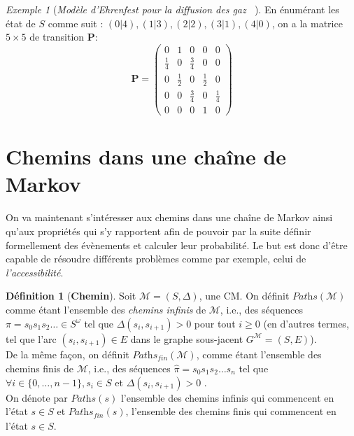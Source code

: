 \documentclass[12pt,a4paper]{report}
\theoremstyle{definition}%
\newtheorem{definition}{Définition}[chapter]
\theoremstyle{remark}
\newtheorem{example}{Exemple}[chapter]
\newcommand{\ie}{i.e., }
\begin{document}
\begin{example}[\textit{Modèle d'Ehrenfest pour la diffusion des gaz ~\cite{Course3}}]
	En énumérant les état de $S$ comme suit : $(0|4), (1|3), (2|2), (3|1), (4|0)$, on a la matrice $5\times5$ de transition $\textbf{P}$:
	\[
		\textbf{P} =
			\begin{pmatrix}
			0 & 1 & 0 & 0 & 0 \\
			\frac{1}{4} & 0 & \frac{3}{4}& 0 & 0 \\
			0 & \frac{1}{2} & 0 & \frac{1}{2} & 0 \\
			0 & 0 & \frac{3}{4} & 0 & \frac{1}{4} \\
			0 & 0 & 0 & 1 & 0
			\end{pmatrix}
	\]
\end{example}

\section{Chemins dans une chaîne de Markov}
On va maintenant s'intéresser aux chemins dans une chaîne de Markov ainsi qu'aux propriétés qui s'y rapportent afin de pouvoir par la suite définir formellement des évènements et calculer leur probabilité. Le but est donc d'être capable de résoudre différents problèmes comme par exemple, celui de \textit{l'accessibilité}.

\begin{definition}[\textbf{Chemin}]
	Soit $\mathcal{M} = (S, \Delta)$, une CM.
	On définit $\textit{Paths}(\mathcal{M})$ comme étant l'ensemble des \textit{chemins infinis} de $\mathcal{M}$, \ie des séquences $\pi = s_0 s_1 s_2 \dots \in S^\omega$ tel que $\Delta(s_i, s_{i+1}) > 0$ pour tout $i \geq 0$ (en d'autres termes, tel que l'arc $(s_i, s_{i+1}) \in E$ dans le graphe sous-jacent $G^\mathcal{M} = (S, E)$).\\
	De la même façon, on définit $\textit{Paths}_\textit{fin}(\mathcal{M})$, comme étant l'ensemble des chemins finis de $\mathcal{M}$, \ie des séquences $\hat{\pi} = s_0 s_1 s_2 \dots s_n$ tel que $\forall i \in \{0, \dots, n-1\}, s_i \in S$ et $\Delta(s_i, s_{i+1}) > 0$ .\\
	On dénote par $\textit{Paths}(s)$ l'ensemble des chemins infinis qui commencent en l'état $s \in S$ et $\textit{Paths}_\textit{fin}(s)$, l'ensemble des chemins finis qui commencent en l'état $s \in S$.
\end{definition}
\end{document}
